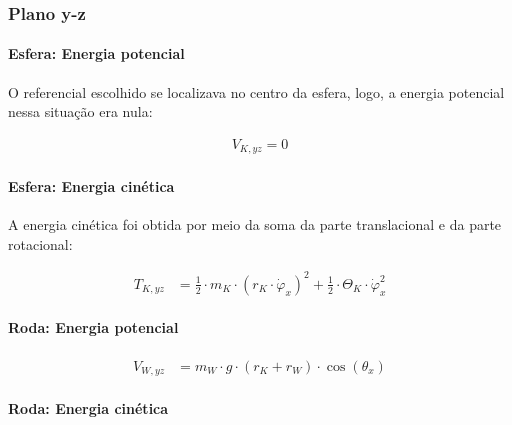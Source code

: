 \subsubsection{Plano y-z}

\paragraph{Esfera: Energia potencial}

O referencial escolhido se localizava no centro da esfera, logo, a energia potencial nessa situação era nula:

\begin{equation*}
    \begin{aligned}
        V_{K,yz} = 0
    \end{aligned}
\end{equation*}

\paragraph{Esfera: Energia cinética}

A energia cinética foi obtida por meio da soma da parte translacional e da parte rotacional:

\begin{equation*}
    \begin{aligned}
        T_{K,yz} & =\frac{1}{2} \cdot m_K \cdot (r_K \cdot \dot\varphi_x)^2 + \frac{1}{2} \cdot \Theta_K \cdot \dot\varphi_x^2
    \end{aligned}
\end{equation*}

\paragraph{Roda: Energia potencial}

\begin{equation*}
    \begin{aligned}
        V_{W,yz} & = m_W \cdot g \cdot (r_K + r_W) \cdot \cos{(\theta_x)}
    \end{aligned}
\end{equation*}

\paragraph{Roda: Energia cinética}

